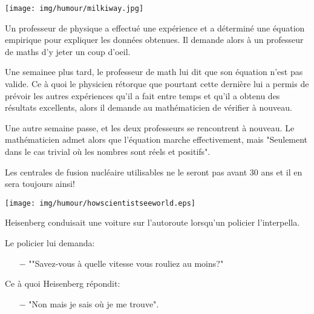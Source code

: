 \begin{center}\underline{\hspace{5 cm}}\end{center}

	\begin{center}
	\texttt{[image: img/humour/milkiway.jpg]}
	\end{center}
\begin{center}\underline{\hspace{5 cm}}\end{center}

Un professeur de physique a effectué une expérience et a déterminé une équation empirique pour expliquer les données obtenues. Il demande alors à un professeur de maths d'y jeter un coup d'oeil.

Une semainee plus tard, le professeur de math lui dit que son équation n'est pas valide. Ce à quoi le physicien rétorque que pourtant cette dernière lui a permis de prévoir les autres expériences qu'il a fait entre temps et qu'il a obtenu des résultats excellents, alors il demande au mathématicien de vérifier à nouveau.

Une autre semaine passe, et les deux professeurs se rencontrent à nouveau. Le mathématicien admet alors que l'équation marche effectivement, mais "Seulement dans le cas trivial où les nombres sont réels et positifs".

\begin{center}\underline{\hspace{5 cm}}\end{center}
	
	Les centrales de fusion nucléaire utilisables ne le seront pas avant 30 ans et il en sera toujours ainsi!
	
	\pagebreak
	\begin{center}
	\texttt{[image: img/humour/howscientistseeworld.eps]}
	\end{center}
	
	\pagebreak
	
	Heisenberg conduisait une voiture sur l'autoroute lorsqu'un policier l'interpella.

	Le policier lui demanda:	
	\begin{itemize}	 
		\item[$-$] ""Savez-vous à quelle vitesse vous rouliez au moins?"
	\end{itemize}
	
	Ce à quoi Heisenberg répondit:
	
	\begin{itemize}	 
		\item[$-$] "Non mais je sais où je me trouve".
	\end{itemize}
	
